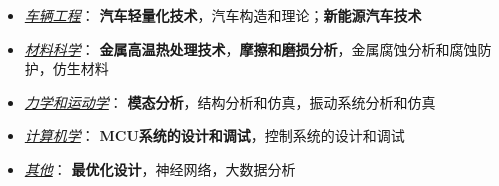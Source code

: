 \documentclass[zh]{resume}
\newcommand{\Matlab}{\textsc{Matlab}\textregistered }
\newcommand{\Ansys}{\textsc{Ansys}\textregistered }
\newcommand{\Mathematica}{\textsc{Mathematica}\textregistered }
\newcommand{\Microsoft}{\textsc{Microsoft}\textregistered }
\begin{document}
\begin{itemize}
  \item \textit{\underline{车辆工程}}： \textbf{汽车轻量化技术}，汽车构造和理论；\textbf{新能源汽车技术}
  \item \textit{\underline{材料科学}}： \textbf{金属高温热处理技术}，\textbf{摩擦和磨损分析}，金属腐蚀分析和腐蚀防护，仿生材料
  \item \textit{\underline{力学和运动学}}： \textbf{模态分析}，结构分析和仿真，振动系统分析和仿真
  \item \textit{\underline{计算机学}}： \textbf{MCU系统的设计和调试}，控制系统的设计和调试
  \item \textit{\underline{其他}}： \textbf{最优化设计}，神经网络，大数据分析
\end{itemize}

% 
%  
%  
%  
\end{document}
